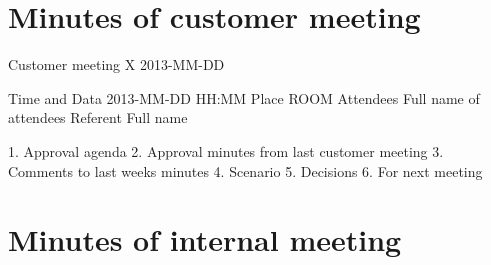 \section{Minutes of customer meeting}

Customer meeting X 
2013-MM-DD

Time and Data 	2013-MM-DD HH:MM
Place			ROOM
Attendees  		Full name of attendees
Referent  		Full name

1. Approval agenda
2. Approval minutes from last customer meeting
3. Comments to last weeks minutes
4. Scenario
5. Decisions
6. For next meeting

\section{Minutes of internal meeting}